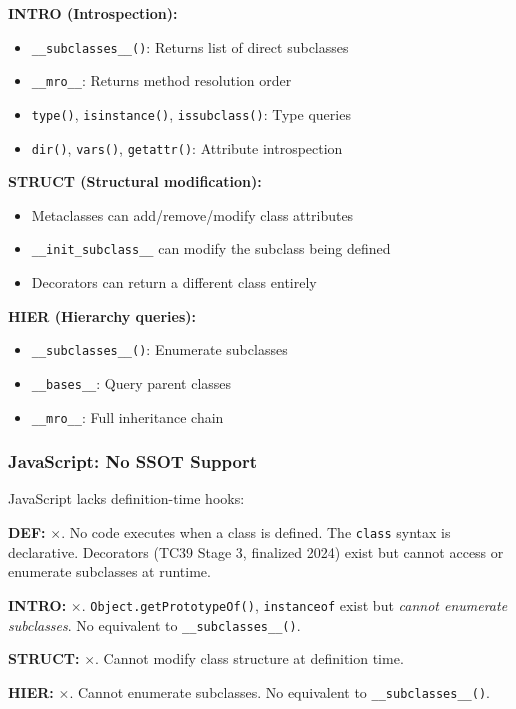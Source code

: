 \textbf{INTRO (Introspection):}
\begin{itemize}
\tightlist
\item \texttt{\_\_subclasses\_\_()}: Returns list of direct subclasses
\item \texttt{\_\_mro\_\_}: Returns method resolution order
\item \texttt{type()}, \texttt{isinstance()}, \texttt{issubclass()}: Type queries
\item \texttt{dir()}, \texttt{vars()}, \texttt{getattr()}: Attribute introspection
\end{itemize}

\textbf{STRUCT (Structural modification):}
\begin{itemize}
\tightlist
\item Metaclasses can add/remove/modify class attributes
\item \texttt{\_\_init\_subclass\_\_} can modify the subclass being defined
\item Decorators can return a different class entirely
\end{itemize}

\textbf{HIER (Hierarchy queries):}
\begin{itemize}
\tightlist
\item \texttt{\_\_subclasses\_\_()}: Enumerate subclasses
\item \texttt{\_\_bases\_\_}: Query parent classes
\item \texttt{\_\_mro\_\_}: Full inheritance chain
\end{itemize}

\subsubsection{JavaScript: No SSOT Support}

JavaScript lacks definition-time hooks:

\textbf{DEF:} $\times$. No code executes when a class is defined. The \texttt{class} syntax is declarative. Decorators (TC39 Stage 3, finalized 2024) exist but cannot access or enumerate subclasses at runtime.

\textbf{INTRO:} $\times$. \texttt{Object.getPrototypeOf()}, \texttt{instanceof} exist but \emph{cannot enumerate subclasses}. No equivalent to \texttt{\_\_subclasses\_\_()}.

\textbf{STRUCT:} $\times$. Cannot modify class structure at definition time.

\textbf{HIER:} $\times$. Cannot enumerate subclasses. No equivalent to \texttt{\_\_subclasses\_\_()}.

